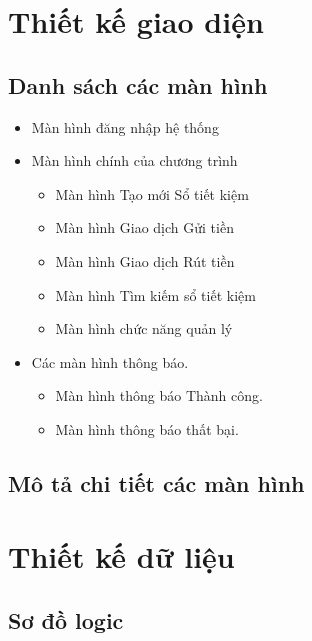 \documentclass{article}
\begin{document}
\begin{itemize}
\begin{itemize}
				\end{itemize}
			
		\end{itemize}

	\newpage
	\section{Thiết kế giao diện}
	\subsection{Danh sách các màn hình}
	
		\begin{itemize}
			\item Màn hình đăng nhập hệ thống
			\item Màn hình chính của chương trình
			
				\begin{itemize}
					\item Màn hình Tạo mới Sổ tiết kiệm
					\item Màn hình Giao dịch Gửi tiền
					\item Màn hình Giao dịch Rút tiền
					\item Màn hình Tìm kiếm sổ tiết kiệm
					\item Màn hình chức năng quản lý
				\end{itemize}
			
			\item Các màn hình thông báo.
			
				\begin{itemize}
					\item Màn hình thông báo Thành công.
					\item Màn hình thông báo thất bại.
				\end{itemize}
			
		\end{itemize}
	
	\subsection{Mô tả chi tiết các màn hình}
	
	\section{Thiết kế dữ liệu}
	\subsection{Sơ đồ logic}
\end{document}
